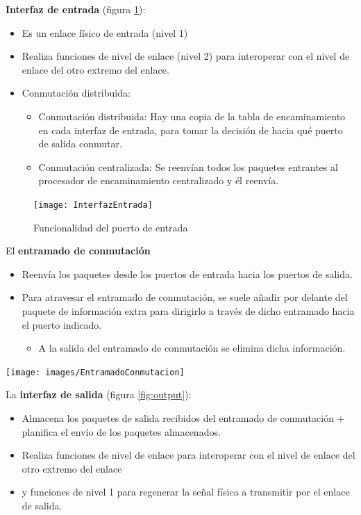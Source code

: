 \documentclass[10pt,portrait, twocolumn]{article}
\begin{document}
\textbf{Interfaz de entrada} (figura \ref{fig:input}):
	\begin{itemize}
	\item Es un enlace físico de entrada (nivel 1)
	\item Realiza funciones de nivel de enlace (nivel 2) para interoperar con el nivel de enlace del otro extremo del enlace.
	\item Conmutación distribuida:
	\begin{itemize}
		\item Conmutación distribuida: Hay una copia de la tabla de encaminamiento en cada interfaz de entrada, para tomar la decisión de hacia qué puerto de salida conmutar.
		\item Conmutación centralizada: Se reenvían todos los paquetes entrantes al procesador de encaminamiento centralizado y él reenvía.
	\end{itemize}		
	\end{itemize}

\begin{figure}[h]
	\centering
     \texttt{[image: InterfazEntrada]}
      \caption{Funcionalidad del puerto de entrada}
      \label{fig:input}
\end{figure}

El \textbf{entramado de conmutación} 

\begin{itemize}
\item Reenvía los paquetes desde los puertos de entrada hacia los puertos de salida.
\item  Para atravesar el entramado de conmutación, se suele añadir por delante del paquete de información extra para dirigirlo a través de dicho entramado hacia el puerto indicado. 
	\begin{itemize}
	\item A la salida del entramado de conmutación se elimina dicha información.
	\end{itemize}
\end{itemize}

\begin{center}
	\texttt{[image: images/EntramadoConmutacion]}
\end{center}

La \textbf{interfaz de salida} (figura \ref{fig:output}):

\begin{itemize}
\item Almacena los paquetes de salida recibidos del entramado de conmutación + planifica el envío de los paquetes almacenados.
\item  Realiza funciones de nivel de enlace para interoperar con el nivel de enlace del otro extremo del enlace
\item  y funciones de nivel 1 para regenerar la señal física a transmitir por el enlace de salida.
\end{itemize}
\end{document}
